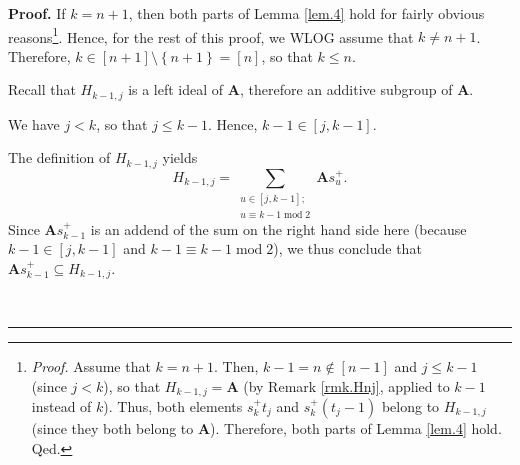 \documentclass[numbers=enddot,12pt,final,onecolumn,notitlepage]{scrartcl}%
\theoremstyle{definition}
\newenvironment{proof}[1][Proof]{\noindent\textbf{#1.} }{\ \rule{0.5em}{0.5em}}
\let\sumnonlimits\sum
\renewcommand{\sum}{\sumnonlimits\limits}
\begin{document}
\begin{proof}
If $k=n+1$, then both parts of Lemma \ref{lem.4} hold for fairly obvious
reasons\footnote{\textit{Proof.} Assume that $k=n+1$. Then, $k-1=n\notin%
\left[  n-1\right]  $ and $j\leq k-1$ (since $j<k$), so that $H_{k-1,j}%
=\mathbf{A}$ (by Remark \ref{rmk.Hnj}, applied to $k-1$ instead of $k$). Thus,
both elements $s_{k}^{+}t_{j}$ and $s_{k}^{+}\left(  t_{j}-1\right)  $ belong
to $H_{k-1,j}$ (since they both belong to $\mathbf{A}$). Therefore, both parts
of Lemma \ref{lem.4} hold. Qed.}. Hence, for the rest of this proof, we WLOG
assume that $k\neq n+1$. Therefore, $k\in\left[  n+1\right]  \setminus\left\{
n+1\right\}  =\left[  n\right]  $, so that $k\leq n$.

Recall that $H_{k-1,j}$ is a left ideal of $\mathbf{A}$, therefore an additive
subgroup of $\mathbf{A}$.

We have $j<k$, so that $j\leq k-1$. Hence, $k-1\in\left[  j,k-1\right]  $.

The definition of $H_{k-1,j}$ yields%
\begin{equation}
H_{k-1,j}=\sum_{\substack{u\in\left[  j,k-1\right]  ;\\u\equiv
k-1\operatorname{mod}2}}\mathbf{A}s_{u}^{+}. \label{pf.lem.4.H=}%
\end{equation}
Since $\mathbf{A}s_{k-1}^{+}$ is an addend of the sum on the right hand side
here (because $k-1\in\left[  j,k-1\right]  $ and $k-1\equiv
k-1\operatorname{mod}2$), we thus conclude that $\mathbf{A}s_{k-1}%
^{+}\subseteq H_{k-1,j}$.


\end{proof}
\end{document}

